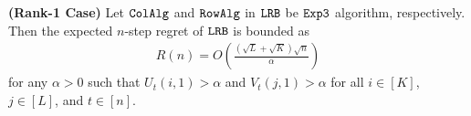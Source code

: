 


\begin{theorem} \textbf{(Rank-1 Case)} 
\label{thm:upper bound} Let ${\tt ColAlg}$ and ${\tt RowAlg}$ in ${\tt LRB}$ be ${\tt Exp3}$ algorithm, respectively. Then the expected $n$-step regret of ${\tt LRB}$ is bounded as
\begin{align*}
  R(n) = O\left(\frac{\left(\sqrt{L } + \sqrt{K }\right)\sqrt{n}}{\alpha}\right)
\end{align*}
for any $\alpha > 0$ such that $U_{t}(i,1) > \alpha$ and $V_{t}(j,1) > \alpha$  for all $i \in [K]$, $j \in [L]$, and $t \in [n]$.


\end{theorem}
